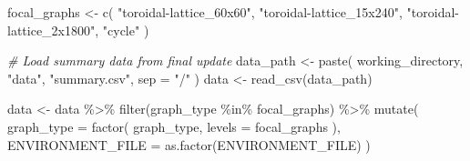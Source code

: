 \documentclass[
]{book}
\newenvironment{Shaded}{\begin{snugshade}}{\end{snugshade}}
\newcommand{\AttributeTok}[1]{\textcolor[rgb]{0.77,0.63,0.00}{#1}}
\newcommand{\CommentTok}[1]{\textcolor[rgb]{0.56,0.35,0.01}{\textit{#1}}}
\newcommand{\FunctionTok}[1]{\textcolor[rgb]{0.00,0.00,0.00}{#1}}
\newcommand{\NormalTok}[1]{#1}
\newcommand{\OtherTok}[1]{\textcolor[rgb]{0.56,0.35,0.01}{#1}}
\newcommand{\SpecialCharTok}[1]{\textcolor[rgb]{0.00,0.00,0.00}{#1}}
\newcommand{\StringTok}[1]{\textcolor[rgb]{0.31,0.60,0.02}{#1}}
\begin{document}
\begin{Shaded}
\begin{Highlighting}[]
\NormalTok{focal\_graphs }\OtherTok{\textless{}{-}} \FunctionTok{c}\NormalTok{(}
  \StringTok{"toroidal{-}lattice\_60x60"}\NormalTok{,}
  \StringTok{"toroidal{-}lattice\_15x240"}\NormalTok{,}
  \StringTok{"toroidal{-}lattice\_2x1800"}\NormalTok{,}
  \StringTok{"cycle"}
\NormalTok{)}

\CommentTok{\# Load summary data from final update}
\NormalTok{data\_path }\OtherTok{\textless{}{-}} \FunctionTok{paste}\NormalTok{(}
\NormalTok{  working\_directory,}
  \StringTok{"data"}\NormalTok{,}
  \StringTok{"summary.csv"}\NormalTok{,}
  \AttributeTok{sep =} \StringTok{"/"}
\NormalTok{)}
\NormalTok{data }\OtherTok{\textless{}{-}} \FunctionTok{read\_csv}\NormalTok{(data\_path)}

\NormalTok{data }\OtherTok{\textless{}{-}}\NormalTok{ data }\SpecialCharTok{\%\textgreater{}\%}
  \FunctionTok{filter}\NormalTok{(graph\_type }\SpecialCharTok{\%in\%}\NormalTok{ focal\_graphs) }\SpecialCharTok{\%\textgreater{}\%}
  \FunctionTok{mutate}\NormalTok{(}
    \AttributeTok{graph\_type =} \FunctionTok{factor}\NormalTok{(}
\NormalTok{      graph\_type,}
      \AttributeTok{levels =}\NormalTok{ focal\_graphs}
\NormalTok{    ),}
    \AttributeTok{ENVIRONMENT\_FILE =} \FunctionTok{as.factor}\NormalTok{(ENVIRONMENT\_FILE)}
\NormalTok{  )}
\end{Highlighting}
\end{Shaded}

\begin{Shaded}
\end{Shaded}
\end{document}
